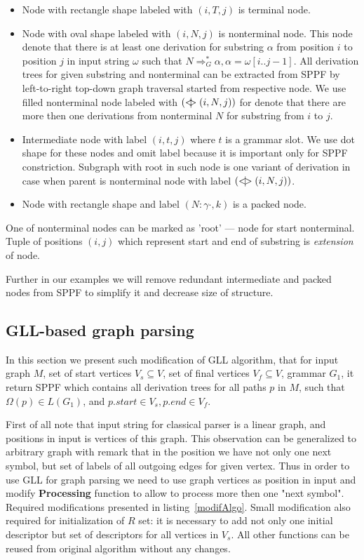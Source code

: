 \begin{itemize}
    \item Node with rectangle shape labeled with $(i, T, j)$ is terminal node.     
    \item Node with oval shape labeled with $(i, N, j)$ is nonterminal node. 
    This node denote that there is at least one derivation for substring $\alpha$ from position $i$ to position $j$ in input string $\omega$ such that $N \Rightarrow^*_G \alpha, \alpha = \omega[i..j-1] $.
    All derivation trees for given substring and nonterminal can be extracted from SPPF by left-to-right top-down graph traversal started from respective node. 
    We use filled nonterminal node labeled with $(<\mkern-11mu | \mkern-11mu> (i, N, j))$ for denote that there are more then one derivations from nonterminal $N$ for substring from $i$ to $j$.
    \item Intermediate node with label $(i,t,j)$ where $t$ is a grammar slot. We use dot shape for these nodes and omit label because it is important only for SPPF constriction.
	Subgraph with root in such node is one variant of derivation in case when parent is nonterminal node with label $(<\mkern-9mu | \mkern-9mu> (i, N, j))$.
    \item Node with rectangle shape and label $(N : \gamma \cdot, k)$ is a packed node.
\end{itemize}
One of nonterminal nodes can be marked as 'root' --- node for start nonterminal. Tuple of positions $(i,j)$ which represent start and end of substring is \textit{extension} of node.

Further in our examples we will remove redundant intermediate and packed nodes from SPPF to simplify it and decrease size of structure.

\subsection{GLL-based graph parsing}

In this section we present such modification of GLL algorithm, that for input graph $M$, set of start vertices $V_s\subseteq V$, set of final vertices $V_f\subseteq V$, grammar $G_1$, it return SPPF which contains all derivation trees for all paths $p$ in $M$, such that $\Omega(p) \in L(G_1)$, and $p.start \in V_s, p.end \in V_f$.

First of all note that input string for classical parser is a linear graph, and positions in input is vertices of this graph.
This observation can be generalized to arbitrary graph with remark that in the position we have not only one next symbol, but set of labels of all outgoing edges for given vertex. 
Thus in order to use GLL for graph parsing we need to use graph vertices as position in input and modify \textbf{Processing} function to allow to process more then one "next symbol".
Required modifications presented in listing~\ref{modifAlgo}.
Small modification also required for initialization of $R$ set: it is necessary to add not only one initial descriptor but set of descriptors for all vertices in $V_s$.
All other functions can be reused from original algorithm without any changes.

